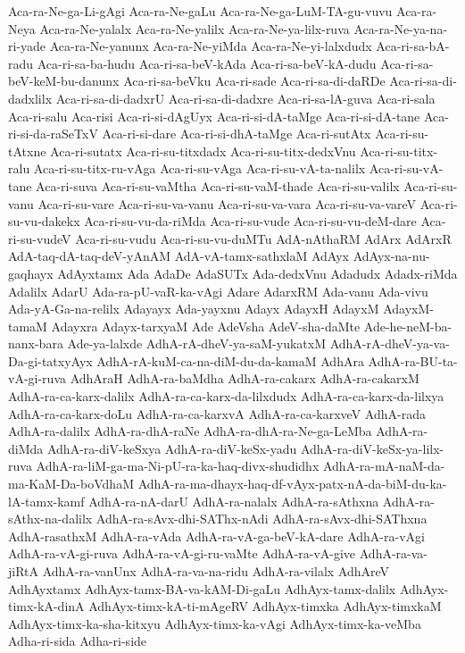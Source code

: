 {Aca-ra-Ne-ga-Li-gAgi
Aca-ra-Ne-gaLu
Aca-ra-Ne-ga-LuM-TA-gu-vuvu
Aca-ra-Neya
Aca-ra-Ne-yalalx
Aca-ra-Ne-yalilx
Aca-ra-Ne-ya-lilx-ruva
Aca-ra-Ne-ya-na-ri-yade
Aca-ra-Ne-yanunx
Aca-ra-Ne-yiMda
Aca-ra-Ne-yi-lalxdudx
Aca-ri-sa-bA-radu
Aca-ri-sa-ba-hudu
Aca-ri-sa-beV-kAda
Aca-ri-sa-beV-kA-dudu
Aca-ri-sa-beV-keM-bu-danunx
Aca-ri-sa-beVku
Aca-ri-sade
Aca-ri-sa-di-daRDe
Aca-ri-sa-di-dadxlilx
Aca-ri-sa-di-dadxrU
Aca-ri-sa-di-dadxre
Aca-ri-sa-lA-guva
Aca-ri-sala
Aca-ri-salu
Aca-risi
Aca-ri-si-dAgUyx
Aca-ri-si-dA-taMge
Aca-ri-si-dA-tane
Aca-ri-si-da-raSeTxV
Aca-ri-si-dare
Aca-ri-si-dhA-taMge
Aca-ri-sutAtx
Aca-ri-su-tAtxne
Aca-ri-sutatx
Aca-ri-su-titxdadx
Aca-ri-su-titx-dedxVnu
Aca-ri-su-titx-ralu
Aca-ri-su-titx-ru-vAga
Aca-ri-su-vAga
Aca-ri-su-vA-ta-nalilx
Aca-ri-su-vA-tane
Aca-ri-suva
Aca-ri-su-vaMtha
Aca-ri-su-vaM-thade
Aca-ri-su-valilx
Aca-ri-su-vanu
Aca-ri-su-vare
Aca-ri-su-va-vanu
Aca-ri-su-va-vara
Aca-ri-su-va-vareV
Aca-ri-su-vu-dakekx
Aca-ri-su-vu-da-riMda
Aca-ri-su-vude
Aca-ri-su-vu-deM-dare
Aca-ri-su-vudeV
Aca-ri-su-vudu
Aca-ri-su-vu-duMTu
AdA-nAthaRM
AdArx
AdArxR
AdA-taq-dA-taq-deV-yAnAM
AdA-vA-tamx-sathxlaM
AdAyx
AdAyx-na-nu-gaqhayx
AdAyxtamx
Ada
AdaDe
AdaSUTx
Ada-dedxVnu
Adadudx
Adadx-riMda
Adalilx
AdarU
Ada-ra-pU-vaR-ka-vAgi
Adare
AdarxRM
Ada-vanu
Ada-vivu
Ada-yA-Ga-na-relilx
Adayayx
Ada-yayxnu
Adayx
AdayxH
AdayxM
AdayxM-tamaM
Adayxra
Adayx-tarxyaM
Ade
AdeVsha
AdeV-sha-daMte
Ade-he-neM-ba-nanx-bara
Ade-ya-lalxde
AdhA-rA-dheV-ya-saM-yukatxM
AdhA-rA-dheV-ya-va-Da-gi-tatxyAyx
AdhA-rA-kuM-ca-na-diM-du-da-kamaM
AdhAra
AdhA-ra-BU-ta-vA-gi-ruva
AdhAraH
AdhA-ra-baMdha
AdhA-ra-cakarx
AdhA-ra-cakarxM
AdhA-ra-ca-karx-dalilx
AdhA-ra-ca-karx-da-lilxdudx
AdhA-ra-ca-karx-da-lilxya
AdhA-ra-ca-karx-doLu
AdhA-ra-ca-karxvA
AdhA-ra-ca-karxveV
AdhA-rada
AdhA-ra-dalilx
AdhA-ra-dhA-raNe
AdhA-ra-dhA-ra-Ne-ga-LeMba
AdhA-ra-diMda
AdhA-ra-diV-keSxya
AdhA-ra-diV-keSx-yadu
AdhA-ra-diV-keSx-ya-lilx-ruva
AdhA-ra-liM-ga-ma-Ni-pU-ra-ka-haq-divx-shudidhx
AdhA-ra-mA-naM-da-ma-KaM-Da-boVdhaM
AdhA-ra-ma-dhayx-haq-df-vAyx-patx-nA-da-biM-du-ka-lA-tamx-kamf
AdhA-ra-nA-darU
AdhA-ra-nalalx
AdhA-ra-sAthxna
AdhA-ra-sAthx-na-dalilx
AdhA-ra-sAvx-dhi-SAThx-nAdi
AdhA-ra-sAvx-dhi-SAThxna
AdhA-rasathxM
AdhA-ra-vAda
AdhA-ra-vA-ga-beV-kA-dare
AdhA-ra-vAgi
AdhA-ra-vA-gi-ruva
AdhA-ra-vA-gi-ru-vaMte
AdhA-ra-vA-give
AdhA-ra-va-jiRtA
AdhA-ra-vanUnx
AdhA-ra-va-na-ridu
AdhA-ra-vilalx
AdhAreV
AdhAyxtamx
AdhAyx-tamx-BA-va-kAM-Di-gaLu
AdhAyx-tamx-dalilx
AdhAyx-timx-kA-dinA
AdhAyx-timx-kA-ti-mAgeRV
AdhAyx-timxka
AdhAyx-timxkaM
AdhAyx-timx-ka-sha-kitxyu
AdhAyx-timx-ka-vAgi
AdhAyx-timx-ka-veMba
Adha-ri-sida
Adha-ri-side
}
